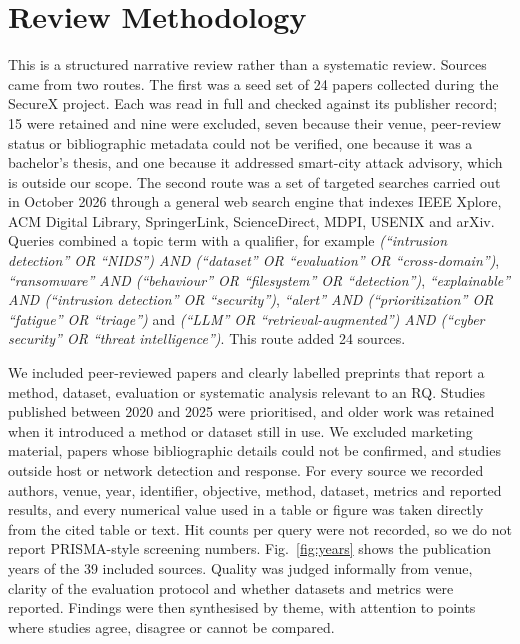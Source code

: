 \documentclass[conference]{IEEEtran}
\begin{document}
\section{Review Methodology}
This is a structured narrative review rather than a systematic review. Sources came from two routes. The first was a seed set of 24 papers collected during the SecureX project. Each was read in full and checked against its publisher record; 15 were retained and nine were excluded, seven because their venue, peer-review status or bibliographic metadata could not be verified, one because it was a bachelor's thesis, and one because it addressed smart-city attack advisory, which is outside our scope. The second route was a set of targeted searches carried out in October 2026 through a general web search engine that indexes IEEE Xplore, ACM Digital Library, SpringerLink, ScienceDirect, MDPI, USENIX and arXiv. Queries combined a topic term with a qualifier, for example \textit{(``intrusion detection'' OR ``NIDS'') AND (``dataset'' OR ``evaluation'' OR ``cross-domain'')}, \textit{``ransomware'' AND (``behaviour'' OR ``filesystem'' OR ``detection'')}, \textit{``explainable'' AND (``intrusion detection'' OR ``security'')}, \textit{``alert'' AND (``prioritization'' OR ``fatigue'' OR ``triage'')} and \textit{(``LLM'' OR ``retrieval-augmented'') AND (``cyber security'' OR ``threat intelligence'')}. This route added 24 sources.

We included peer-reviewed papers and clearly labelled preprints that report a method, dataset, evaluation or systematic analysis relevant to an RQ. Studies published between 2020 and 2025 were prioritised, and older work was retained when it introduced a method or dataset still in use. We excluded marketing material, papers whose bibliographic details could not be confirmed, and studies outside host or network detection and response. For every source we recorded authors, venue, year, identifier, objective, method, dataset, metrics and reported results, and every numerical value used in a table or figure was taken directly from the cited table or text. Hit counts per query were not recorded, so we do not report PRISMA-style screening numbers. Fig.~\ref{fig:years} shows the publication years of the 39 included sources. Quality was judged informally from venue, clarity of the evaluation protocol and whether datasets and metrics were reported. Findings were then synthesised by theme, with attention to points where studies agree, disagree or cannot be compared.
\end{document}
